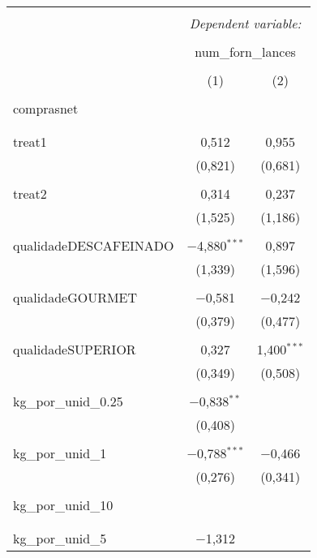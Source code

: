 
\begin{table}[!htbp] \centering 
  \caption{} 
  \label{} 
\begin{tabular}{@{\extracolsep{5pt}}lcc} 
\\[-1.8ex]\hline 
\hline \\[-1.8ex] 
 & \multicolumn{2}{c}{\textit{Dependent variable:}} \\ 
\cline{2-3} 
\\[-1.8ex] & \multicolumn{2}{c}{num\_forn\_lances} \\ 
\\[-1.8ex] & (1) & (2)\\ 
\hline \\[-1.8ex] 
 comprasnet &  &  \\ 
  &  &  \\ 
  & & \\ 
 treat1 & 0,512 & 0,955 \\ 
  & (0,821) & (0,681) \\ 
  & & \\ 
 treat2 & 0,314 & 0,237 \\ 
  & (1,525) & (1,186) \\ 
  & & \\ 
 qualidadeDESCAFEINADO & $-$4,880$^{***}$ & 0,897 \\ 
  & (1,339) & (1,596) \\ 
  & & \\ 
 qualidadeGOURMET & $-$0,581 & $-$0,242 \\ 
  & (0,379) & (0,477) \\ 
  & & \\ 
 qualidadeSUPERIOR & 0,327 & 1,400$^{***}$ \\ 
  & (0,349) & (0,508) \\ 
  & & \\ 
 kg\_por\_unid\_0.25 & $-$0,838$^{**}$ &  \\ 
  & (0,408) &  \\ 
  & & \\ 
 kg\_por\_unid\_1 & $-$0,788$^{***}$ & $-$0,466 \\ 
  & (0,276) & (0,341) \\ 
  & & \\ 
 kg\_por\_unid\_10 &  &  \\ 
  &  &  \\ 
  & & \\ 
 kg\_por\_unid\_5 & $-$1,312 &  \\ 

\end{tabular}
\end{table}
